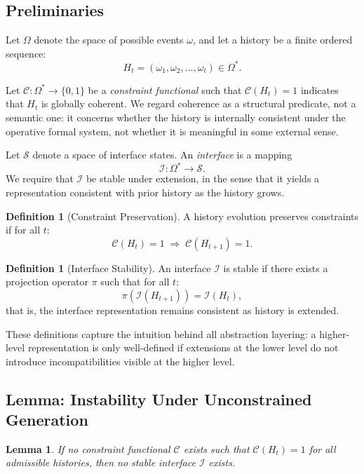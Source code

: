 \documentclass[12pt, a4paper]{article}
\theoremstyle{plain}
\newtheorem{lemma}[theorem]{Lemma}
\theoremstyle{definition}
\newtheorem{definition}[theorem]{Definition}
\theoremstyle{remark}
\begin{document}
\subsection{Preliminaries}

Let $\Omega$ denote the space of possible events $\omega$, and let a history be a finite ordered sequence:
\[
H_t = (\omega_1, \omega_2, \dots, \omega_t) \in \Omega^*.
\]

Let $\mathcal{C} : \Omega^* \to \{0,1\}$ be a \emph{constraint functional} such that $\mathcal{C}(H_t) = 1$ indicates that $H_t$ is globally coherent. We regard coherence as a structural predicate, not a semantic one: it concerns whether the history is internally consistent under the operative formal system, not whether it is meaningful in some external sense.

Let $\mathcal{S}$ denote a space of interface states. An \emph{interface} is a mapping
\[
\mathcal{I} : \Omega^* \to \mathcal{S}.
\]
We require that $\mathcal{I}$ be stable under extension, in the sense that it yields a representation consistent with prior history as the history grows.

\begin{definition}[Constraint Preservation]
A history evolution preserves constraints if for all $t$:
\[
\mathcal{C}(H_t) = 1 \;\Rightarrow\; \mathcal{C}(H_{t+1}) = 1.
\]
\end{definition}

\begin{definition}[Interface Stability]
An interface $\mathcal{I}$ is stable if there exists a projection operator $\pi$ such that for all $t$:
\[
\pi(\mathcal{I}(H_{t+1})) = \mathcal{I}(H_t),
\]
that is, the interface representation remains consistent as history is extended.
\end{definition}

These definitions capture the intuition behind all abstraction layering: a higher-level representation is only well-defined if extensions at the lower level do not introduce incompatibilities visible at the higher level.

\subsection{Lemma: Instability Under Unconstrained Generation}

\begin{lemma}
If no constraint functional $\mathcal{C}$ exists such that $\mathcal{C}(H_t) = 1$ for all admissible histories, then no stable interface $\mathcal{I}$ exists.
\end{lemma}
\end{document}
